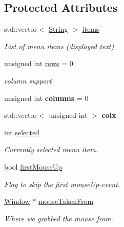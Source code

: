 \subsection*{Protected Attributes}
\begin{DoxyCompactItemize}
\item 
\hypertarget{classGUI_1_1Menu_a79489d4aad9217752d8ca11e5153071a}{std\-::vector$<$ \hyperlink{classGUI_1_1String}{String} $>$ \hyperlink{classGUI_1_1Menu_a79489d4aad9217752d8ca11e5153071a}{items}}\label{classGUI_1_1Menu_a79489d4aad9217752d8ca11e5153071a}

\begin{DoxyCompactList}\small\item\em List of menu items (displayed text) \end{DoxyCompactList}\item 
\hypertarget{classGUI_1_1Menu_a9e4b784d77a44d2f28f7de3ef8501e48}{unsigned int \hyperlink{classGUI_1_1Menu_a9e4b784d77a44d2f28f7de3ef8501e48}{rows} = 0}\label{classGUI_1_1Menu_a9e4b784d77a44d2f28f7de3ef8501e48}

\begin{DoxyCompactList}\small\item\em column support \end{DoxyCompactList}\item 
\hypertarget{classGUI_1_1Menu_a257973235955f73190d0f962087e124c}{unsigned int {\bfseries columns} = 0}\label{classGUI_1_1Menu_a257973235955f73190d0f962087e124c}

\item 
\hypertarget{classGUI_1_1Menu_ac2879a1e630c90f6bcc53b448bde419b}{std\-::vector$<$ unsigned int $>$ {\bfseries colx}}\label{classGUI_1_1Menu_ac2879a1e630c90f6bcc53b448bde419b}

\item 
int \hyperlink{classGUI_1_1Menu_a6934c1ce59c87dc59630390e8fb37e1a}{selected}
\begin{DoxyCompactList}\small\item\em Currently selected menu item. \end{DoxyCompactList}\item 
\hypertarget{classGUI_1_1Menu_a9e895284ef822bb4ddc892a33055ec0f}{bool \hyperlink{classGUI_1_1Menu_a9e895284ef822bb4ddc892a33055ec0f}{first\-Mouse\-Up}}\label{classGUI_1_1Menu_a9e895284ef822bb4ddc892a33055ec0f}

\begin{DoxyCompactList}\small\item\em Flag to skip the first mouse\-Up-\/event. \end{DoxyCompactList}\item 
\hypertarget{classGUI_1_1Menu_a14a3a5fc17c803026ffe5ceded5047b5}{\hyperlink{classGUI_1_1Window}{Window} $\ast$ \hyperlink{classGUI_1_1Menu_a14a3a5fc17c803026ffe5ceded5047b5}{mouse\-Taken\-From}}\label{classGUI_1_1Menu_a14a3a5fc17c803026ffe5ceded5047b5}

\begin{DoxyCompactList}\small\item\em Where we grabbed the mouse from. \end{DoxyCompactList}\end{DoxyCompactItemize}


